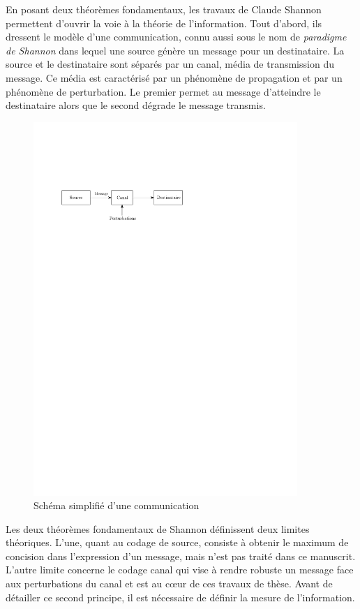 En posant deux théorèmes fondamentaux, les travaux de Claude Shannon permettent d'ouvrir la voie à la théorie de 
l'information. Tout d'abord, ils dressent le modèle d'une communication, connu aussi sous le nom de 
\emph{paradigme de Shannon} dans lequel une source génère un message pour un destinataire. La source et le 
destinataire sont séparés par un canal, média de transmission du message. 
Ce média est caractérisé par un phénomène de propagation et par un phénomène de perturbation. Le premier permet au message d'atteindre le destinataire alors que le second dégrade le message transmis.

\begin{figure}[!h]
	\centering
	\includegraphics[width=10cm]{main/ch1_fig/shParadigm.pdf}
	\caption{\label{fig:paradigme} Schéma simplifié d'une communication}
\end{figure}


Les deux théorèmes fondamentaux de Shannon définissent deux limites théoriques. L'une, quant au codage de source, 
consiste à obtenir le maximum de concision dans l'expression d'un message, mais n'est pas traité dans ce manuscrit. 
L'autre limite concerne le codage canal qui vise à rendre robuste un message face aux perturbations du canal et est au cœur de ces travaux de thèse. Avant de détailler ce second principe, il est nécessaire de définir la mesure de l'information.

